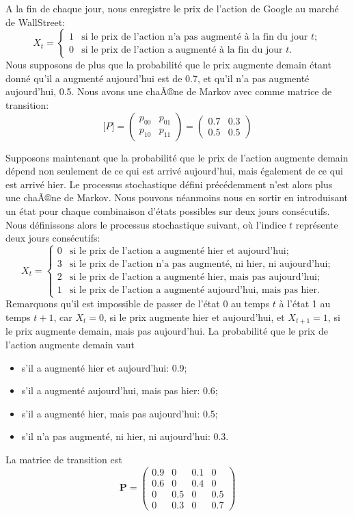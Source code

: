 \begin{example}
A la fin de chaque jour, nous enregistre le prix de l'action de Google au marché de WallStreet:
\[
X_t =
\begin{cases}
1 & \mbox{si le prix de l'action n'a pas augmenté à la fin du jour }t; \\
0 & \mbox{si le prix de l'action a augmenté à la fin du jour }t.
\end{cases}
\]
Nous supposons de plus que la probabilité que le prix augmente demain étant donné qu'il a augmenté aujourd'hui est de 0.7, et qu'il n'a pas augmenté aujourd'hui, 0.5.
Nous avons une chaÃ®ne de Markov avec comme matrice de transition:
\[
\boldsymbol[P] =
\begin{pmatrix}
p_{00} & p_{01} \\
p_{10} & p_{11}
\end{pmatrix}
=
\begin{pmatrix}
0.7 & 0.3 \\
0.5 & 0.5
\end{pmatrix}
\]

Supposons maintenant que la probabilité que le prix de l'action augmente demain dépend non seulement de ce qui est arrivé aujourd'hui, mais également de ce qui est arrivé hier.
Le processus stochastique défini précédemment n'est alors plus une chaÃ®ne de Markov.
Nous pouvons néanmoins nous en sortir en introduisant un état pour
chaque combinaison d'états possibles sur deux jours consécutifs.
Nous définissons alors le processus stochastique suivant, où l'indice $t$ représente deux jours consécutifs:
\[
X_t =
\begin{cases}
0 & \mbox{si le prix de l'action a augmenté hier et aujourd'hui}; \\
3 & \mbox{si le prix de l'action n'a pas augmenté, ni hier, ni aujourd'hui}; \\
2 & \mbox{si le prix de l'action a augmenté hier, mais pas aujourd'hui}; \\
1 &  \mbox{si le prix de l'action a augmenté aujourd'hui, mais pas hier.}
\end{cases}
\]
Remarquons qu'il est impossible de passer de l'état 0 au temps $t$ à l'état 1 au temps $t+1$, car
$X_t = 0$, si le prix augmente hier et aujourd'hui, et $X_{t+1} = 1$, si le prix augmente demain, mais pas aujourd'hui.
La probabilité que le prix de l'action augmente demain vaut
\begin{itemize}
\item
s'il a augmenté hier et aujourd'hui: 0.9;
\item
s'il a augmenté aujourd'hui, mais pas hier: 0.6;
\item
s'il a augmenté hier, mais pas aujourd'hui: 0.5;
\item
s'il n'a pas augmenté, ni hier, ni aujourd'hui: 0.3.
\end{itemize}
La matrice de transition est
\[
\boldsymbol{P} =
\begin{pmatrix}
0.9 & 0 & 0.1 & 0 \\
0.6 & 0 & 0.4 & 0 \\
0 & 0.5 & 0 & 0.5 \\
0 & 0.3 & 0 & 0.7
\end{pmatrix}
\]
\end{example}

